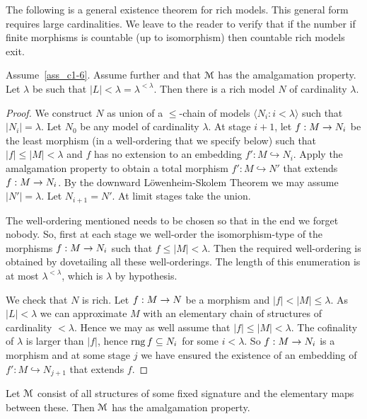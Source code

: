 The following is a general existence theorem for rich models.
This general form requires large cardinalities.
We leave to the reader to verify that if the number if finite morphisms is countable (up to isomorphism) then countable rich models exit.

\begin{theorem}  Assume~\ref{ass_c1-6}.
Assume further  and that $\EuScript M$ has the amalgamation property.
Let $\lambda$ be such that $|L|<\lambda=\lambda^{<\lambda}$.
Then there is a rich model $N$ of cardinality $\lambda$.
\end{theorem}

\begin{proof} We construct $N$ as union of a $\le$-chain of models $\langle N_i:i < \lambda\rangle$ such that $|N_i| = \lambda$.
Let $N_0$ be any model of cardinality $\lambda$.
At stage $i+1$, let $f:M\rightarrow N_i$ be the least morphism (in a well-ordering that we specify below) such that $|f|\le|M|<\lambda$ and $f$ has no extension to an embedding $f':M\hookrightarrow N_i$.
Apply the amalgamation property to obtain a total morphism $f':M\hookrightarrow N'$ that extends $f:M\rightarrow N_i$.
By the downward L\"owenheim-Skolem Theorem we may assume $|N'|=\lambda$.
Let $N_{i+1}=N'$.
At limit stages take the union.

The well-ordering mentioned needs to be chosen so that in the end we forget nobody.
So, first at each stage we well-order the isomorphism-type of the morphisms $f:M\rightarrow N_i$ such that  $f\le|M|<\lambda$.
Then the required well-ordering is obtained by dovetailing all these well-orderings.
The length of this enumeration is at most $\lambda^{<\lambda}$, which is $\lambda$ by hypothesis.

We check that $N$ is rich.
Let $f:M\rightarrow N$ be a morphism and $|f|<|M|\le\lambda$.
As $|L|<\lambda$ we can approximate $M$ with an elementary chain of structures of cardinality $<\lambda$.
Hence we may as well assume that $|f|\le|M|<\lambda$.
The cofinality of $\lambda$ is larger than $|f|$, hence $\mathop{\rm rng} f\subseteq N_i$ for some $i<\lambda$.
So $f:M\rightarrow N_i$ is a morphism and at some stage $j$ we have ensured the existence of an embedding of $f':M\hookrightarrow N_{j+1}$ that extends $f$.
\end{proof}

\begin{proposition}\label{prop_elementary_amalg}
Let $\EuScript M$ consist of all structures of some fixed signature and the elementary maps between these.
Then $\EuScript M$ has the amalgamation property.
\end{proposition}

